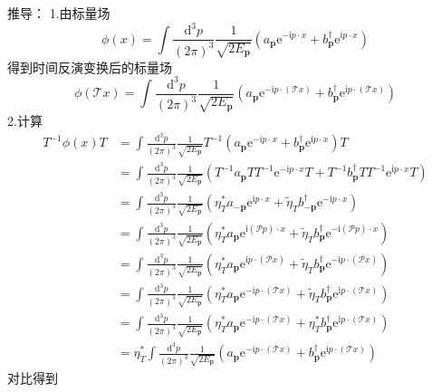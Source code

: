 推导：
1.由标量场
\begin{equation}
    \phi (x)=\int{\frac{\mathrm{d}^3p}{\left( 2\pi \right) ^3}\frac{1}{\sqrt{2E_{\mathbf{p}}}}\left( a_{\mathbf{p}}\mathrm{e}^{-\mathrm{i}p\cdot x}+b_{\mathbf{p}}^{\dagger}\mathrm{e}^{\mathrm{i}p\cdot x} \right)}
\end{equation}
得到时间反演变换后的标量场
\begin{equation}
    \phi (\mathcal{T} x)=\int{\frac{\mathrm{d}^3p}{\left( 2\pi \right) ^3}\frac{1}{\sqrt{2E_{\mathbf{p}}}}\left( a_{\mathbf{p}}\mathrm{e}^{-\mathrm{i}p\cdot \left( \mathcal{T} x \right)}+b_{\mathbf{p}}^{\dagger}\mathrm{e}^{\mathrm{i}p\cdot \left( \mathcal{T} x \right)} \right)}
\end{equation}
2.计算
\begin{equation}
    \begin{aligned}
        T^{-1}\phi \left( x \right) T&=\int{\frac{\mathrm{d}^3p}{\left( 2\pi \right) ^3}\frac{1}{\sqrt{2E_{\mathbf{p}}}}T^{-1}\left( a_{\mathbf{p}}\mathrm{e}^{-\mathrm{i}p\cdot x}+b_{\mathbf{p}}^{\dagger}\mathrm{e}^{\mathrm{i}p\cdot x} \right)}T
\\
&=\int{\frac{\mathrm{d}^3p}{\left( 2\pi \right) ^3}}\frac{1}{\sqrt{2E_{\mathbf{p}}}}\left( T^{-1}a_{\mathbf{p}}TT^{-1}\mathrm{e}^{-\mathrm{i}p\cdot x}T+T^{-1}b_{\mathbf{p}}^{\dagger}TT^{-1}\mathrm{e}^{\mathrm{i}p\cdot x}T \right) 
\\
&=\int{\frac{\mathrm{d}^3p}{\left( 2\pi \right) ^3}}\frac{1}{\sqrt{2E_{\mathbf{p}}}}\left( \eta _{T}^{*}a_{-\mathbf{p}}\mathrm{e}^{\mathrm{i}p\cdot x}+\tilde{\eta}_Tb_{-\mathbf{p}}^{\dagger}\mathrm{e}^{-\mathrm{i}p\cdot x} \right) 
\\
&=\int{\frac{\mathrm{d}^3p}{\left( 2\pi \right) ^3}}\frac{1}{\sqrt{2E_{\mathbf{p}}}}\left( \eta _{T}^{*}a_{\mathbf{p}}\mathrm{e}^{\mathrm{i}\left( \mathcal{P} p \right) \cdot x}+\tilde{\eta}_Tb_{\mathbf{p}}^{\dagger}\mathrm{e}^{-\mathrm{i}\left( \mathcal{P} p \right) \cdot x} \right) 
\\
&=\int{\frac{\mathrm{d}^3p}{\left( 2\pi \right) ^3}}\frac{1}{\sqrt{2E_{\mathbf{p}}}}\left( \eta _{T}^{*}a_{\mathbf{p}}\mathrm{e}^{\mathrm{i}p\cdot \left( \mathcal{P} x \right)}+\tilde{\eta}_Tb_{\mathbf{p}}^{\dagger}\mathrm{e}^{-\mathrm{i}p\cdot \left( \mathcal{P} x \right)} \right) 
\\
&=\int{\frac{\mathrm{d}^3p}{\left( 2\pi \right) ^3}}\frac{1}{\sqrt{2E_{\mathbf{p}}}}\left( \eta _{T}^{*}a_{\mathbf{p}}\mathrm{e}^{-\mathrm{i}p\cdot (\mathcal{T} x)}+\tilde{\eta}_Tb_{\mathbf{p}}^{\dagger}\mathrm{e}^{\mathrm{i}p\cdot (\mathcal{T} x)} \right) 
\\
&=\int{\frac{\mathrm{d}^3p}{\left( 2\pi \right) ^3}}\frac{1}{\sqrt{2E_{\mathbf{p}}}}\left( \eta _{T}^{*}a_{\mathbf{p}}\mathrm{e}^{-\mathrm{i}p\cdot (\mathcal{T} x)}+\eta _{T}^{*}b_{\mathbf{p}}^{\dagger}\mathrm{e}^{\mathrm{i}p\cdot (\mathcal{T} x)} \right) 
\\
&=\eta _{T}^{*}\int{\frac{\mathrm{d}^3p}{\left( 2\pi \right) ^3}}\frac{1}{\sqrt{2E_{\mathbf{p}}}}\left( a_{\mathbf{p}}\mathrm{e}^{-\mathrm{i}p\cdot (\mathcal{T} x)}+b_{\mathbf{p}}^{\dagger}\mathrm{e}^{\mathrm{i}p\cdot (\mathcal{T} x)} \right) 
    \end{aligned}
\end{equation}
对比得到


